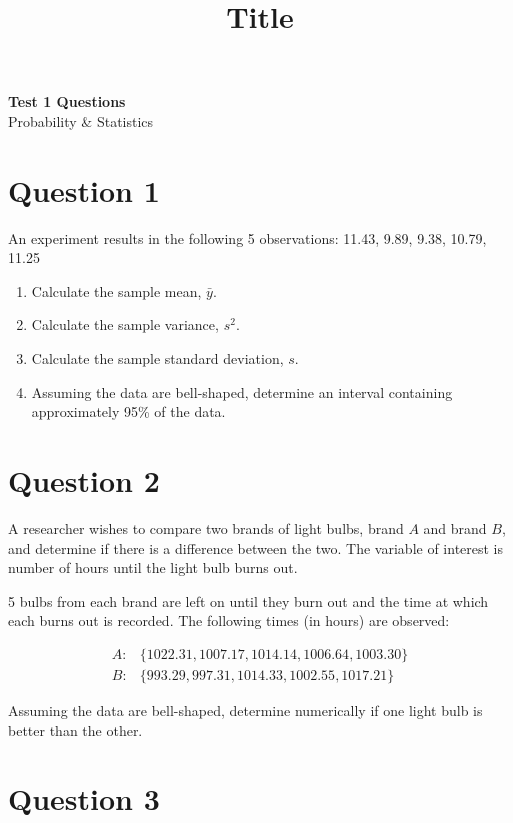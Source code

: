 \documentclass[11pt]{article}
\theoremstyle{definition}
\begin{document}
\title{Title}

\thispagestyle{empty}

\begin{center}
{\LARGE \bf Test 1 Questions} \\
{\large Probability \& Statistics} \\
\end{center}
\section*{Question 1}

An experiment results in the following 5 observations: 11.43,  9.89,  9.38, 10.79, 11.25

\begin{enumerate}
	\item Calculate the sample mean, $\bar{y}$.
	\item Calculate the sample variance, $s^2$.
	\item Calculate the sample standard deviation, $s$.
	\item Assuming the data are bell-shaped, determine an interval containing approximately 95\% of the data.
\end{enumerate}

\section*{Question 2}

A researcher wishes to compare two brands of light bulbs, brand $A$ and brand $B$, and determine if there is a difference between the two. The variable of interest is number of hours until the light bulb burns out.

5 bulbs from each brand are left on until they burn out and the time at which each burns out is recorded. The following times (in hours) are observed:

$$
	\begin{aligned}
		A: & \{1022.31, 1007.17, 1014.14, 1006.64, 1003.30\} \\
		B: & \{993.29,  997.31, 1014.33, 1002.55, 1017.21\}
	\end{aligned}
$$

Assuming the data are bell-shaped, determine numerically if one light bulb is better than the other.

\newpage

\section*{Question 3}
\end{document}
